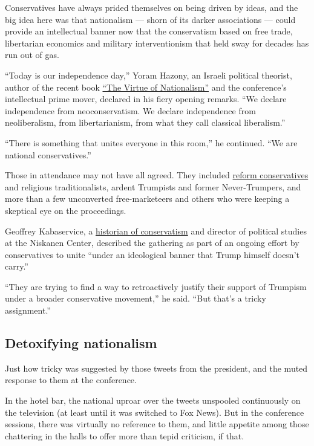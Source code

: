 Conservatives have always prided themselves on being driven by ideas,
and the big idea here was that nationalism --- shorn of its darker
associations --- could provide an intellectual banner now that the
conservatism based on free trade, libertarian economics and military
interventionism that held sway for decades has run out of gas.

``Today is our independence day,'' Yoram Hazony, an Israeli political
theorist, author of the recent book
\href{https://www.nationalreview.com/magazine/2018/10/01/in-defense-of-nations-book-review/}{``The
Virtue of Nationalism''} and the conference's intellectual prime mover,
declared in his fiery opening remarks. ``We declare independence from
neoconservatism. We declare independence from neoliberalism, from
libertarianism, from what they call classical liberalism.''

``There is something that unites everyone in this room,'' he continued.
``We are national conservatives.''

Those in attendance may not have all agreed. They included
\href{https://www.nytimes3xbfgragh.onion/2014/07/06/magazine/can-the-gop-be-a-party-of-ideas.html}{reform
conservatives} and religious traditionalists, ardent Trumpists and
former Never-Trumpers, and more than a few unconverted free-marketeers
and others who were keeping a skeptical eye on the proceedings.

Geoffrey Kabaservice, a
\href{https://global.oup.com/academic/product/rule-and-ruin-9780199768400?cc=us\&lang=en\&}{historian
of conservatism} and director of political studies at the Niskanen
Center, described the gathering as part of an ongoing effort by
conservatives to unite ``under an ideological banner that Trump himself
doesn't carry.''

``They are trying to find a way to retroactively justify their support
of Trumpism under a broader conservative movement,'' he said. ``But
that's a tricky assignment.''

\hypertarget{detoxifying-nationalism}{%
\subsection{Detoxifying nationalism}\label{detoxifying-nationalism}}

Just how tricky was suggested by those tweets from the president, and
the muted response to them at the conference.

In the hotel bar, the national uproar over the tweets unspooled
continuously on the television (at least until it was switched to Fox
News). But in the conference sessions, there was virtually no reference
to them, and little appetite among those chattering in the halls to
offer more than tepid criticism, if that.

